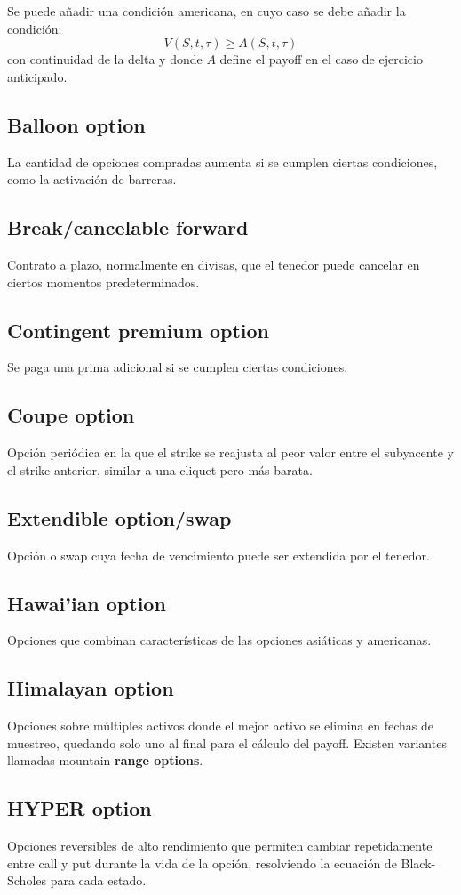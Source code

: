 Se puede añadir una condición americana, en cuyo caso se debe añadir la condición:
\begin{equation*}
    \boxed{V(S, t, \tau) \geq A(S, t, \tau)}
\end{equation*}
con continuidad de la delta y donde $A$ define el payoff en el caso de ejercicio anticipado.





\subsection{Balloon option}
La cantidad de opciones compradas aumenta si se cumplen ciertas condiciones, como la activación de barreras.

\subsection{Break/cancelable forward}
Contrato a plazo, normalmente en divisas, que el tenedor puede cancelar en ciertos momentos predeterminados.

\subsection{Contingent premium option}
Se paga una prima adicional si se cumplen ciertas condiciones.

\subsection{Coupe option}
Opción periódica en la que el strike se reajusta al peor valor entre el subyacente y el strike anterior, similar a una cliquet pero más barata.

\subsection{Extendible option/swap}
Opción o swap cuya fecha de vencimiento puede ser extendida por el tenedor.

\subsection{Hawai’ian option}
Opciones que combinan características de las opciones asiáticas y americanas.

\subsection{Himalayan option}
Opciones sobre múltiples activos donde el mejor activo se elimina en fechas de muestreo, quedando solo uno al final para el cálculo del payoff. Existen variantes llamadas mountain \textbf{range options}.

\subsection{HYPER option}
Opciones reversibles de alto rendimiento que permiten cambiar repetidamente entre call y put durante la vida de la opción, resolviendo la ecuación de Black-Scholes para cada estado.



















